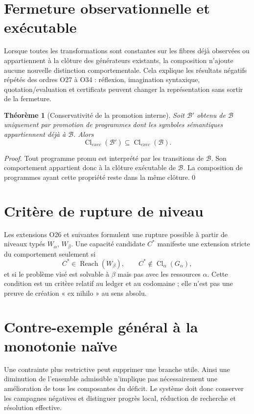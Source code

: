 \documentclass[11pt,a4paper,openany]{book}
\newtheorem{theorem}[definition]{Théorème}
\newcommand{\cl}{\operatorname{Cl}}
\newcommand{\Reach}{\operatorname{Reach}}
\begin{document}
\section{Fermeture observationnelle et exécutable}
Lorsque toutes les transformations sont constantes sur les fibres déjà observées ou appartiennent à la clôture des générateurs existants, la composition n'ajoute aucune nouvelle distinction comportementale. Cela explique les résultats négatifs répétés des ordres O27 à O34 : réflexion, imagination syntaxique, quotation/evaluation et certificats peuvent changer la représentation sans sortir de la fermeture.

\begin{theorem}[Conservativité de la promotion interne]
Soit \(\mathcal B'\) obtenu de \(\mathcal B\) uniquement par promotion de programmes dont les symboles sémantiques appartiennent déjà à \(\mathcal B\). Alors
\[
\cl_{exec}(\mathcal B')\subseteq \cl_{exec}(\mathcal B).
\]
\end{theorem}
\begin{proof}
Tout programme promu est interprété par les transitions de \(\mathcal B\). Son comportement appartient donc à la clôture exécutable de \(\mathcal B\). La composition de programmes ayant cette propriété reste dans la même clôture.\qed\end{proof}

\section{Critère de rupture de niveau}
Les extensions O26 et suivantes formulent une rupture possible à partir de niveaux typés \(W_\alpha\), \(W_\beta\). Une capacité candidate \(C^*\) manifeste une extension stricte du comportement seulement si
\[
C^*\in\Reach(W_\beta),
\qquad
C^*\notin\cl_\alpha(G_\alpha),
\]
et si le problème visé est solvable à \(\beta\) mais pas avec les ressources \(\alpha\). Cette condition est un critère relatif au ledger et au codomaine ; elle n'est pas une preuve de création « ex nihilo » au sens absolu.

\section{Contre-exemple général à la monotonie naïve}
Une contrainte plus restrictive peut supprimer une branche utile. Ainsi une diminution de l'ensemble admissible n'implique pas nécessairement une amélioration de tous les composantes du déficit. Le système doit donc conserver les campagnes négatives et distinguer progrès local, réduction de recherche et résolution effective.
\end{document}
